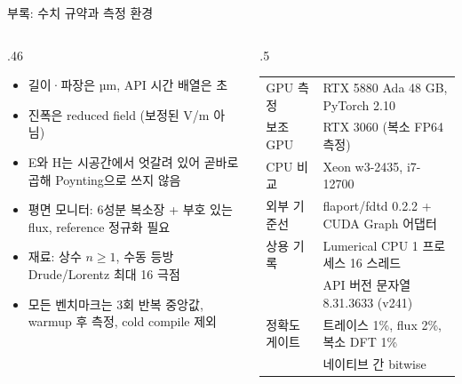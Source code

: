 \documentclass[aspectratio=169,11pt]{beamer}
\begin{document}
\begin{frame}{부록: 수치 규약과 측정 환경}
  \begin{columns}[T]
    \begin{column}{.46\textwidth}
      \begin{itemize}\footnotesize
        \item 길이·파장은 µm, API 시간 배열은 초
        \item 진폭은 reduced field (보정된 V/m 아님)
        \item E와 H는 시공간에서 엇갈려 있어 곧바로 곱해 Poynting으로 쓰지 않음
        \item 평면 모니터: 6성분 복소장 + 부호 있는 flux, reference 정규화 필요
        \item 재료: 상수 $n \geq 1$, 수동 등방 Drude/Lorentz 최대 16 극점
        \item 모든 벤치마크는 3회 반복 중앙값, warmup 후 측정, cold compile 제외 
      \end{itemize}
    \end{column}
    \begin{column}{.5\textwidth}
      \begin{center}\scriptsize
        \begin{tabular}{l l}
          \toprule
          GPU 측정 & RTX 5880 Ada 48 GB, PyTorch 2.10 \\
          보조 GPU & RTX 3060 (복소 FP64 측정) \\
          CPU 비교 & Xeon w3-2435, i7-12700 \\
          외부 기준선 & flaport/fdtd 0.2.2 + CUDA Graph 어댑터 \\
          상용 기록 & Lumerical CPU 1 프로세스 16 스레드 \\
          & API 버전 문자열 8.31.3633 (v241) \\
          정확도 게이트 & 트레이스 1\%, flux 2\%, 복소 DFT 1\% \\
          & 네이티브 간 bitwise \\
          \bottomrule
        \end{tabular}
      \end{center}
      \vspace{2mm}
    \end{column}
  \end{columns}
\end{frame}
\end{document}
